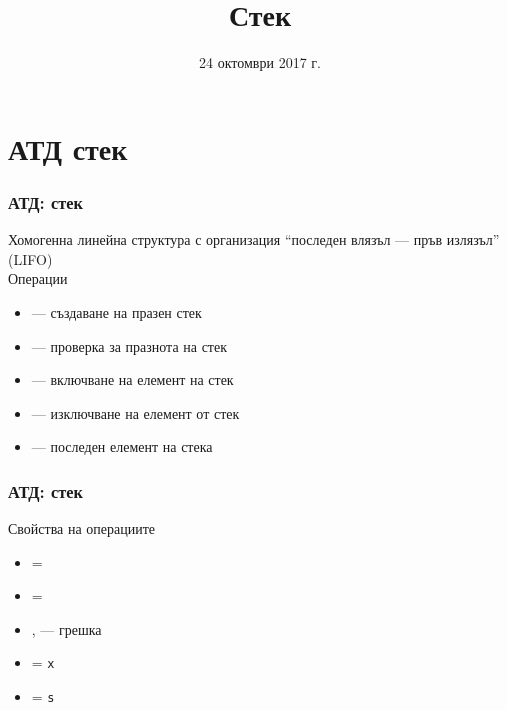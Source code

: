 \documentclass{beamer}
\title{Стек}
\date{24 октомври 2017 г.}
\begin{document}
\begin{frame}
  \titlepage
\end{frame}

\section{АТД стек}

\begin{frame}
  \frametitle{АТД: стек}

  Хомогенна линейна структура с организация ``последен влязъл --- пръв излязъл'' (LIFO)\\[1em]
  Операции\\[0.5em]
  \begin{itemize}
  \item {} --- създаване на празен стек
  \item {} --- проверка за празнота на стек
  \item {} --- включване на елемент на стек
  \item {} --- изключване на елемент от стек
  \item {} --- последен елемент на стека
  \end{itemize}
\end{frame}

\begin{frame}
  \frametitle{АТД: стек}

  Свойства на операциите\\[0.5em]
  \begin{itemize}
  \item {} = 
  \item {} = 
  \item {},  --- \alert{грешка}
  \item {} = \tt x
  \item {} = \tt s
  \end{itemize}
\end{frame}
\end{document}
